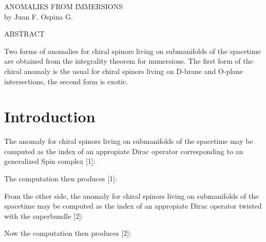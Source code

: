 \documentclass[a4paper,a4paper]{article}
\begin{document}
\begin{center}
ANOMALIES FROM IMMERSIONS\\ [.25in] by Juan F. Ospina G.
\end{center}



\begin{center}
ABSTRACT \\ [.25in]
\end{center}

Two forms of anomalies for chiral spinors living on submanifolds of the spacetime are
obtained from the integrality theorem for immersions. The first form of the chiral
anomaly is the usual for chiral spinors living on D-brane and O-plane intersections,
the second form is exotic.

\section{Introduction}
 \setlength{\baselineskip}{20pt}

The anomaly for chiral spinors living on submanifolds of the spacetime may be computed
as the index of an appropiate Dirac operator corresponding to an generalized Spin
complex [1]:
\begin{center}
\setlength{\baselineskip}{40pt}
 {  \coordHE{}
}
\end{center}

The computation then produces  [1]:
\begin{center}
\setlength{\baselineskip}{40pt}
 {  \coordHE{} }
\end{center}





From the other side, the anomaly for chiral spinors living on submanifolds of the
spacetime may be computed as the index of an appropiate Dirac operator twisted with
the superbundle \myHighlight{${\Xi}\rightarrow{\Sigma}$}\coordHE{} [2]:

\begin{center}
\setlength{\baselineskip}{40pt}
 {  \coordHE{}
}
\end{center}
Now the computation then produces [2]:
\begin{center}
\setlength{\baselineskip}{40pt}
 {  \coordHE{}
}
\end{center}
\end{document}
